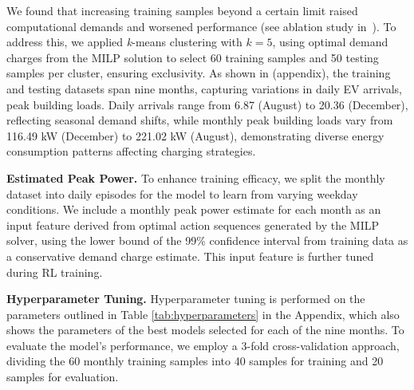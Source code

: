 We found that increasing training samples beyond a certain limit raised computational demands and worsened performance (see ablation study in~). To address this, we applied \textit{k}-means clustering \cite{ikotun2023k} with \( k=5 \), using optimal demand charges from the MILP solution to select 60 training samples and 50 testing samples per cluster, ensuring exclusivity.   
{\color{black} As shown in  (appendix), the training and testing datasets span nine months, capturing variations in daily EV arrivals, peak building loads. Daily arrivals range from 6.87 (August) to 20.36 (December), reflecting seasonal demand shifts, while monthly peak building loads vary from 116.49 kW (December) to 221.02 kW (August), demonstrating diverse energy consumption patterns affecting charging strategies.}  

\noindent \textbf{Estimated Peak Power.} To enhance training efficacy, we split the monthly dataset into daily episodes for the model to learn from varying weekday conditions. We include a monthly peak power estimate for each month as an input feature derived from optimal action sequences generated by the MILP solver, using the lower bound of the 99\% confidence interval from training data as a conservative demand charge estimate. This input feature is further tuned during RL training. 

\noindent \textbf{Hyperparameter Tuning.} 
Hyperparameter tuning is performed on the parameters outlined in Table \ref{tab:hyperparameters} in the Appendix, which also shows the parameters of the best models selected for each of the nine months. 
To evaluate the model's performance, we employ a 3-fold cross-validation approach, dividing the 60 monthly training samples into 40 samples for training and 20 samples for evaluation. 

